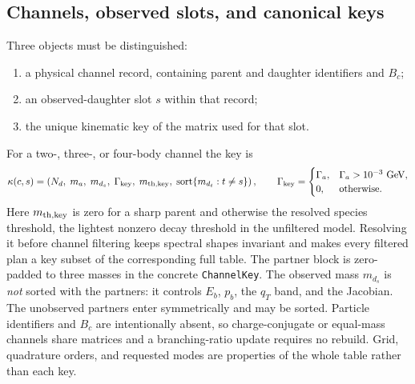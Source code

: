 \documentclass[11pt]{article}
\begin{document}
\subsection{Channels, observed slots, and canonical keys}

Three objects must be distinguished:
\begin{enumerate}
\item a physical channel record, containing parent and daughter identifiers
and $B_c$;
\item an observed-daughter slot $s$ within that record;
\item the unique kinematic key of the matrix used for that slot.
\end{enumerate}
For a two-, three-, or four-body channel the key is
\begin{equation}
\kappa(c,s)=
\left(
N_d,\;m_a,\;m_{d_s},\;\Gamma_{\rm key},\;
 m_{\rm th,key},\;
\operatorname{sort}\{m_{d_t}:t\ne s\}
\right),
\qquad
\Gamma_{\rm key}=
\begin{cases}
\Gamma_a,&\Gamma_a>10^{-3}\ {\rm GeV},\\
0,&\text{otherwise}.
\end{cases}
\label{eq:channel-key}
\end{equation}
Here $m_{\rm th,key}$ is zero for a sharp parent and otherwise the resolved
species threshold, the lightest nonzero decay threshold in the unfiltered
model.  Resolving it before channel filtering keeps spectral shapes invariant
and makes every filtered plan a key subset of the corresponding full table.
The partner block is zero-padded to three masses in the concrete
\texttt{ChannelKey}.  The observed mass $m_{d_s}$ is \emph{not} sorted with
the partners: it controls $E_b$, $p_b$, the $q_T$ band, and the Jacobian.
The unobserved partners enter symmetrically and may be sorted.  Particle
identifiers and $B_c$ are intentionally absent, so charge-conjugate or
equal-mass channels share matrices and a branching-ratio update requires no
rebuild.  Grid, quadrature orders, and requested modes are properties of the
whole table rather than each key.
\end{document}
